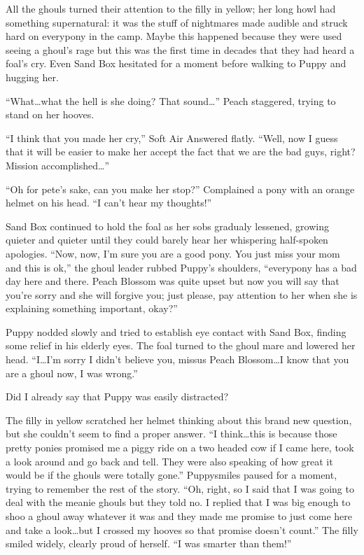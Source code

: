 All the ghouls turned their attention to the filly in yellow; her long howl had something supernatural: it was the stuff of nightmares made audible and struck hard on everypony in the camp. Maybe this happened because they were used seeing a ghoul's rage but this was the first time in decades that they had heard a foal's cry. Even Sand Box hesitated for a moment before walking to Puppy and hugging her.

``What\dots what the hell is she doing? That sound\dots'' Peach staggered, trying to stand on her hooves.

``I think that you made her cry,'' Soft Air Answered flatly. ``Well, now I guess that it will be easier to make her accept the fact that we are the bad guys, right? Mission accomplished\dots''

``Oh for pete's sake, can you make her stop?'' Complained a pony with an orange helmet on his head. ``I can't hear my thoughts!''

Sand Box continued to hold the foal as her sobs gradualy lessened, growing quieter and quieter until they could barely hear her whispering half-spoken apologies. ``Now, now, I'm sure you are a good pony. You just miss your mom and this is ok,'' the ghoul leader rubbed Puppy's shoulders, ``everypony has a bad day here and there. Peach Blossom was quite upset but now you will say that you're sorry and she will forgive you; just please, pay attention to her when she is explaining something important, okay?''

Puppy nodded slowly and tried to establish eye contact with Sand Box, finding some relief in his elderly eyes. The foal turned to the ghoul mare and lowered her head. ``I\dots I'm sorry I didn't believe you, missus Peach Blossom\dots I know that you are a ghoul now, I was wrong.''


Did I already say that Puppy was easily distracted?

The filly in yellow scratched her helmet thinking about this brand new question, but she couldn't seem to find a proper answer. ``I think\dots this is because those pretty ponies promised me a piggy ride on a two headed cow if I came here, took a look around and go back and tell. They were also speaking of how great it would be if the ghouls were totally gone.'' Puppysmiles paused for a moment, trying to remember the rest of the story. ``Oh, right, so I said that I was going to deal with the meanie ghouls but they told no. I replied that I was big enough to shoo a ghoul away whatever it was and they made me promise to just come here and take a look\dots but I crossed my hooves so that promise doesn't count.'' The filly smiled widely, clearly proud of herself. ``I was smarter than them!''

